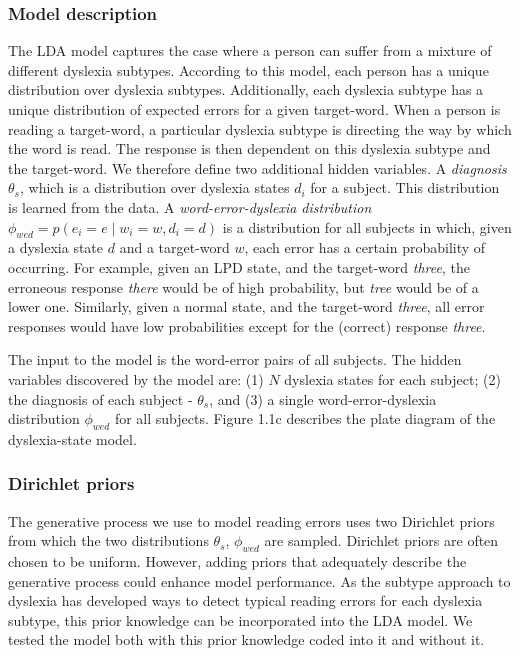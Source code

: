 \subsubsection{Model description}
The LDA model captures the case where a person can suffer from a mixture of different dyslexia subtypes. According to this model, each person has a unique distribution over dyslexia subtypes. Additionally, each dys\-lexia subtype has a unique distribution of expected errors for a given target-word. When a person is reading a target-word, a particular dyslexia subtype is directing the way by which the word is read. The response is then dependent on this dyslexia subtype and the target-word. We therefore define two additional hidden variables. A {\it diagnosis} $ \theta_{s} $, which is a distribution over dyslexia states $ d_i $ for a subject. This distribution is learned from the data. A {\it word-error-dyslexia distribution} $ \phi_{wed} = p(e_i = e \mid w_i = w , d_i= d) $ is a distribution for all subjects in which, given a dyslexia state $d$ and a target-word $w$, each error has a certain probability of occurring. For example, given an LPD state, and the target-word {\it three}, the erroneous response {\it there} would be of high probability, but {\it tree} would be of a lower one. Similarly, given a normal state, and the target-word {\it three}, all error responses would have low probabilities except for the (correct) response {\it three}. 

The input to the model is the word-error pairs of all subjects. The hidden variables discovered by the model are: (1) $N$ dyslexia states for each subject; (2) the diagnosis of each subject - $ \theta_{s} $, and (3) a single word-error-dyslexia distribution $ \phi_{wed} $ for all subjects. Figure 1.1c describes the plate diagram of the dyslexia-state model.

\subsubsection{Dirichlet priors}
The generative process we use to model reading errors uses two Dirichlet priors from which the two distributions $ \theta_{s}$, $\phi_{wed} $ are sampled. Dirichlet priors are often chosen to be uniform. However, adding priors that adequately describe the generative process could enhance model performance. As the subtype approach to dyslexia has developed ways to detect typical reading errors for each dyslexia subtype, this prior knowledge can be incorporated into the LDA model. We tested the model both with this prior knowledge coded into it and without it.

